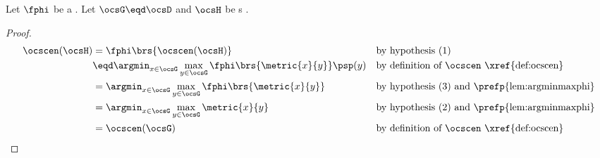 \begin{tabstr}{0.75}
\begin{theorem}
\label{thm:ocsop_mpf}
Let $\fphi$ be a  .
Let $\ocsG\eqd\ocsD$ and $\ocsH$ be s .
\end{theorem}
\begin{proof}
\begin{align*}
  \ocscen(\ocsH)
    &= \fphi\brs{\ocscen(\ocsH)}
    && \text{by hypothesis (1)}
  \\&\eqd \argmin_{x\in\ocsG}\max_{y\in\ocsG}\fphi\brs{\metric{x}{y}}\psp(y)
    && \text{by definition of $\ocscen$ \xref{def:ocscen}}
  \\&= \argmin_{x\in\ocsG}\max_{y\in\ocsG}\fphi\brs{\metric{x}{y}}
    && \text{by hypothesis (3) and \prefp{lem:argminmaxphi}}
  \\&= \argmin_{x\in\ocsG}\max_{y\in\ocsG}\metric{x}{y}
    && \text{by hypothesis (2) and \prefp{lem:argminmaxphi}}
  \\&= \ocscen(\ocsG)
    && \text{by definition of $\ocscen$ \xref{def:ocscen}}
\end{align*}
\end{proof}


\end{tabstr}
